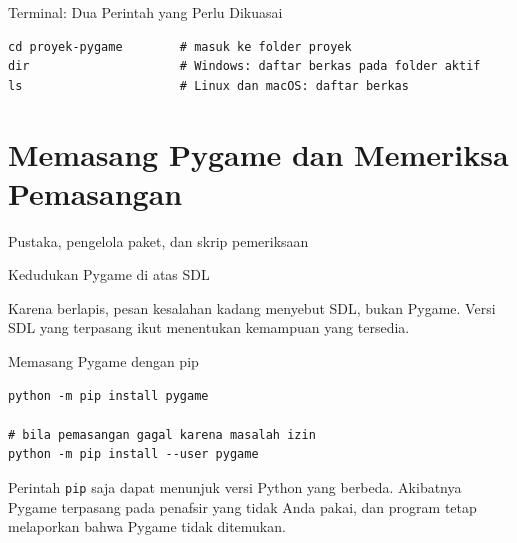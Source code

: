 \documentclass[aspectratio=169,10pt]{beamer}
\begin{document}
\begin{frame}[fragile]{Terminal: Dua Perintah yang Perlu Dikuasai}
\begin{lstlisting}
cd proyek-pygame        # masuk ke folder proyek
dir                     # Windows: daftar berkas pada folder aktif
ls                      # Linux dan macOS: daftar berkas
\end{lstlisting}
\end{frame}

\section{Memasang Pygame dan Memeriksa Pemasangan}
  {Pustaka, pengelola paket, dan skrip pemeriksaan}

\begin{frame}{Kedudukan Pygame di atas SDL}
\centering
{}
\vspace{0.12cm}
\begin{kotak}
Karena berlapis, pesan kesalahan kadang menyebut SDL, bukan Pygame. Versi SDL
yang terpasang ikut menentukan kemampuan yang tersedia.
\end{kotak}
\end{frame}

\begin{frame}[fragile]{Memasang Pygame dengan pip}
\begin{lstlisting}
python -m pip install pygame

# bila pemasangan gagal karena masalah izin
python -m pip install --user pygame
\end{lstlisting}
\vspace{0.15cm}
\begin{peringatan}
Perintah \texttt{pip} saja dapat menunjuk versi Python yang berbeda. Akibatnya
Pygame terpasang pada penafsir yang tidak Anda pakai, dan program tetap
melaporkan bahwa Pygame tidak ditemukan.
\end{peringatan}
\end{frame}
\end{document}
